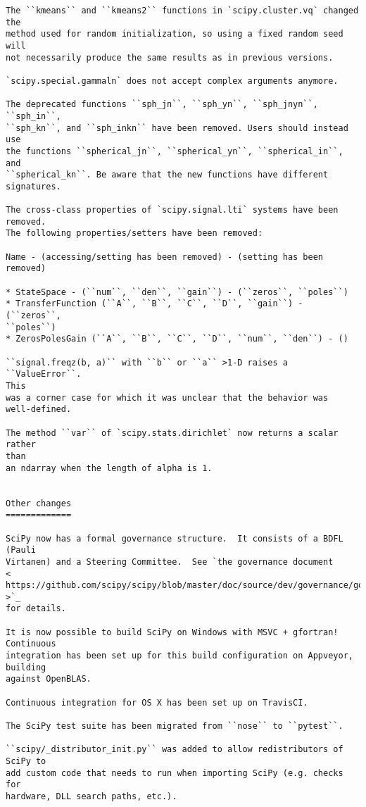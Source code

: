 \begin{verbatim}
The ``kmeans`` and ``kmeans2`` functions in `scipy.cluster.vq` changed the
method used for random initialization, so using a fixed random seed will
not necessarily produce the same results as in previous versions.

`scipy.special.gammaln` does not accept complex arguments anymore.

The deprecated functions ``sph_jn``, ``sph_yn``, ``sph_jnyn``, ``sph_in``,
``sph_kn``, and ``sph_inkn`` have been removed. Users should instead use
the functions ``spherical_jn``, ``spherical_yn``, ``spherical_in``, and
``spherical_kn``. Be aware that the new functions have different
signatures.

The cross-class properties of `scipy.signal.lti` systems have been removed.
The following properties/setters have been removed:

Name - (accessing/setting has been removed) - (setting has been removed)

* StateSpace - (``num``, ``den``, ``gain``) - (``zeros``, ``poles``)
* TransferFunction (``A``, ``B``, ``C``, ``D``, ``gain``) - (``zeros``,
``poles``)
* ZerosPolesGain (``A``, ``B``, ``C``, ``D``, ``num``, ``den``) - ()

``signal.freqz(b, a)`` with ``b`` or ``a`` >1-D raises a ``ValueError``.
This
was a corner case for which it was unclear that the behavior was
well-defined.

The method ``var`` of `scipy.stats.dirichlet` now returns a scalar rather
than
an ndarray when the length of alpha is 1.


Other changes
=============

SciPy now has a formal governance structure.  It consists of a BDFL (Pauli
Virtanen) and a Steering Committee.  See `the governance document
<
https://github.com/scipy/scipy/blob/master/doc/source/dev/governance/governance.rst
>`_
for details.

It is now possible to build SciPy on Windows with MSVC + gfortran!
Continuous
integration has been set up for this build configuration on Appveyor,
building
against OpenBLAS.

Continuous integration for OS X has been set up on TravisCI.

The SciPy test suite has been migrated from ``nose`` to ``pytest``.

``scipy/_distributor_init.py`` was added to allow redistributors of SciPy to
add custom code that needs to run when importing SciPy (e.g. checks for
hardware, DLL search paths, etc.).


\end{verbatim}
